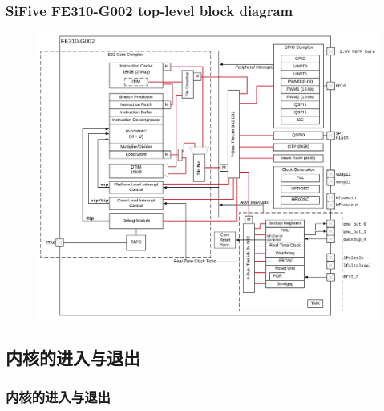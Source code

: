 % 
\begin{frame}
	\frametitle{SiFive FE310-G002 top-level block diagram}
\begin{figure}
    \includegraphics[width=0.55\linewidth]{sifive-board}
\end{figure}
\end{frame}
\subsection{内核的进入与退出}
\begin{frame}
	\frametitle{内核的进入与退出}
\begin{figure}
\end{figure}
\end{frame}
